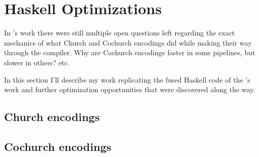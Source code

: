 
\section{Haskell Optimizations}\label{sec:haskell}
In \cite{Harper2011}'s work there were still multiple open questions left regarding the exact mechanics of what Church and Cochurch encodings did while making their way through the compiler. Why are Cochurch encodings faster in some pipelines, but slower in others? etc.

In this section I'll describe my work replicating the fused Haskell code of the \cite{Harper2011}'s work and further optimization opportunities that were discovered along the way.

\subsection{Church encodings}
\subsection{Cochurch encodings}



\iffalse
One question that comes up is: Yes this fusion is nice, but how does the fused code actually provide a speedup, isn't the language already lazy and therefore not ripe for such a speedup? What are Haskell's other optimizations that come into play that pushes the shortcut fusion over the finish as a fast optimization?
\fi




